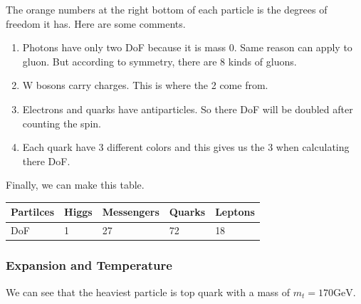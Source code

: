 \documentclass[letterpaper,10pt,english]{sphinxmanual}
\begin{document}
The orange numbers at the right bottom of each particle is the degrees of freedom it has. Here are some comments.
\begin{enumerate}
\item {} 
Photons have only two DoF because it is mass 0. Same reason can apply to gluon. But according to symmetry, there are 8 kinds of gluons.

\item {} 
W bosons carry charges. This is where the 2 come from.

\item {} 
Electrons and quarks have antiparticles. So there DoF will be doubled after counting the spin.

\item {} 
Each quark have 3 different colors and this gives us the 3 when calculating there DoF.

\end{enumerate}

Finally, we can make this table.

\begin{tabulary}{\linewidth}{|L|L|L|L|L|}
\hline
\textsf{\relax 
Partilces
} & \textsf{\relax 
Higgs
} & \textsf{\relax 
Messengers
} & \textsf{\relax 
Quarks
} & \textsf{\relax 
Leptons
}\\
\hline
DoF
 & 
1
 & 
27
 & 
72
 & 
18
\\
\hline\end{tabulary}



\subsubsection{Expansion and Temperature}
\label{Cosmology/cosmoIndex:expansion-and-temperature}
We can see that the heaviest particle is top quark with a mass of $m_t = 170 \mathrm{GeV}$.
\end{document}
